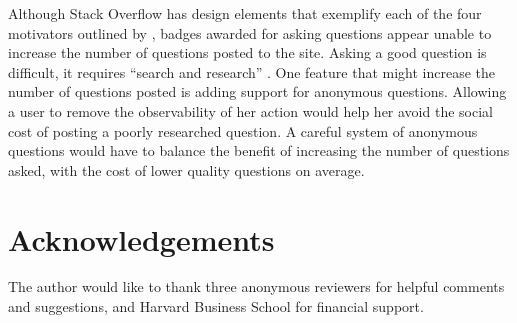 \documentclass{article}
\newcommand{\1}{\mathds{1}}
\begin{document}
Although Stack Overflow has design elements that exemplify each of the four motivators outlined by \citet{Grant2013}, badges awarded for asking questions appear unable to increase the number of questions posted to the site. Asking a good question is difficult, it requires ``search and research'' \cite{so-ask}. One feature that might increase the number of questions posted is adding support for anonymous questions. Allowing a user to remove the observability of her action would help her avoid the social cost of posting a poorly researched question. A careful system of anonymous questions would have to balance the benefit of increasing the number of questions asked, with the cost of lower quality questions on average.

\section*{Acknowledgements}

The author would like to thank three anonymous reviewers for helpful comments and suggestions, and Harvard Business School for financial support.



\end{document}
